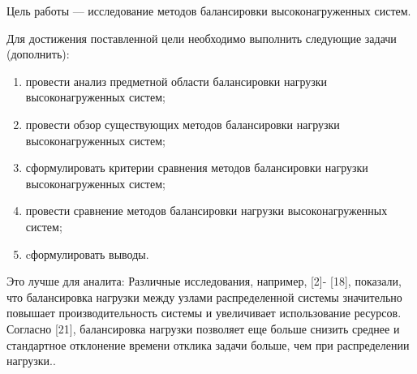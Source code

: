Цель работы --- исследование методов балансировки высоконагруженных систем.

Для достижения поставленной цели необходимо выполнить следующие задачи (дополнить):

\begin{enumerate}[label=---]
	\item провести анализ предметной области балансировки нагрузки высоконагруженных систем;
	\item провести обзор существующих методов балансировки нагрузки высоконагруженных систем;
	\item сформулировать критерии сравнения методов балансировки нагрузки высоконагруженных систем; 
	\item провести сравнение методов балансировки нагрузки высоконагруженных систем; 
	\item cформулировать выводы.
\end{enumerate}

\begin{comment}
\begin{enumerate}[label=---]
	\item определить значение балансировки нагрузки;
	\item обозначить методы балансировки нагрузки;
	\item исследовать обозначенные методы
	\item cформулировать выводы.
\end{enumerate}
\end{comment}

Это лучше для аналита:
Различные исследования, например, [2]- [18], показали, что балансировка нагрузки между узлами распределенной системы значительно повышает производительность системы и увеличивает использование ресурсов. 
Согласно [21], балансировка нагрузки позволяет еще больше снизить среднее и стандартное отклонение времени отклика задачи больше, чем при распределении нагрузки.\cite{4}.


